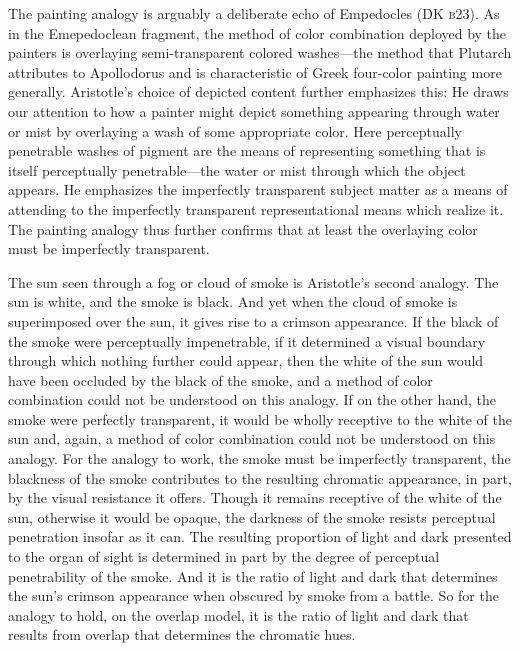 The painting analogy is arguably a deliberate echo of Empedocles (DK \textsc{b}23). As in the Emepedoclean fragment, the method of color combination deployed by the painters is overlaying semi-transparent colored washes---the method that Plutarch attributes to Apollodorus and is characteristic of Greek four-color painting more generally. Aristotle's choice of depicted content further emphasizes this: He draws our attention to how a painter might depict something appearing through water or mist by overlaying a wash of some appropriate color. Here perceptually penetrable washes of pigment are the means of representing something that is itself perceptually penetrable---the water or mist through which the object appears. He emphasizes the imperfectly transparent subject matter as a means of attending to the imperfectly transparent representational means which realize it. The painting analogy thus further confirms that at least the overlaying color must be imperfectly transparent.

The sun seen through a fog or cloud of smoke is Aristotle's second analogy. The sun is white, and the smoke is black. And yet when the cloud of smoke is superimposed over the sun, it gives rise to a crimson appearance. If the black of the smoke were perceptually impenetrable, if it determined a visual boundary through which nothing further could appear, then the white of the sun would have been occluded by the black of the smoke, and a method of color combination could not be understood on this analogy. If on the other hand, the smoke were perfectly transparent, it would be wholly receptive to the white of the sun and, again, a method of color combination could not be understood on this analogy. For the analogy to work, the smoke must be imperfectly transparent, the blackness of the smoke contributes to the resulting chromatic appearance, in part, by the visual resistance it offers. Though it remains receptive of the white of the sun, otherwise it would be opaque, the darkness of the smoke resists perceptual penetration insofar as it can. The resulting proportion of light and dark presented to the organ of sight is determined in part by the degree of perceptual penetrability of the smoke. And it is the ratio of light and dark that determines the sun's crimson appearance when obscured by smoke from a battle. So for the analogy to hold, on the overlap model, it is the ratio of light and dark that results from overlap that determines the chromatic hues.

